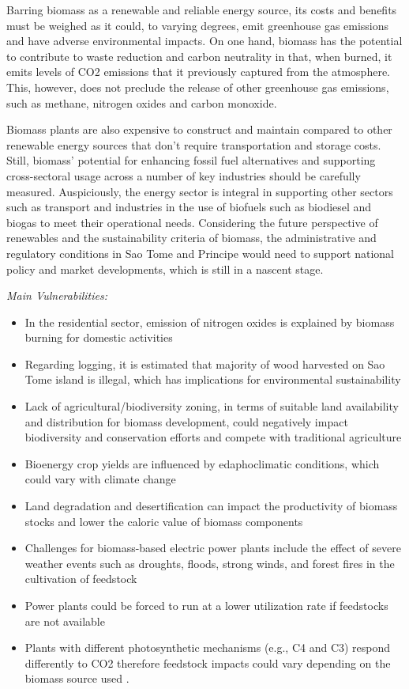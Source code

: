 \documentclass[
]{book}
\providecommand{\tightlist}{%
  \setlength{\itemsep}{0pt}\setlength{\parskip}{0pt}}
\begin{document}
Barring biomass as a renewable and reliable energy source, its costs and benefits must be weighed as it could, to varying degrees, emit greenhouse gas emissions and have adverse environmental impacts. On one hand, biomass has the potential to contribute to waste reduction and carbon neutrality in that, when burned, it emits levels of CO2 emissions that it previously captured from the atmosphere. This, however, does not preclude the release of other greenhouse gas emissions, such as methane, nitrogen oxides and carbon monoxide.

Biomass plants are also expensive to construct and maintain compared to other renewable energy sources that don't require transportation and storage costs. Still, biomass' potential for enhancing fossil fuel alternatives and supporting cross-sectoral usage across a number of key industries should be carefully measured. Auspiciously, the energy sector is integral in supporting other sectors such as transport and industries in the use of biofuels such as biodiesel and biogas to meet their operational needs. Considering the future perspective of renewables and the sustainability criteria of biomass, the administrative and regulatory conditions in Sao Tome and Principe would need to support national policy and market developments, which is still in a nascent stage.

\emph{Main Vulnerabilities:}

\begin{itemize}
\tightlist
\item
  In the residential sector, emission of nitrogen oxides is explained by biomass burning for domestic activities
\item
  Regarding logging, it is estimated that majority of wood harvested on Sao Tome island is illegal, which has implications for environmental sustainability
\item
  Lack of agricultural/biodiversity zoning, in terms of suitable land availability and distribution for biomass development, could negatively impact biodiversity and conservation efforts and compete with traditional agriculture
\item
  Bioenergy crop yields are influenced by edaphoclimatic conditions, which could vary with climate change
\item
  Land degradation and desertification can impact the productivity of biomass stocks and lower the caloric value of biomass components
\item
  Challenges for biomass-based electric power plants include the effect of severe weather events such as droughts, floods, strong winds, and forest fires in the cultivation of feedstock
\item
  Power plants could be forced to run at a lower utilization rate if feedstocks are not available
\item
  Plants with different photosynthetic mechanisms (e.g., C4 and C3) respond differently to CO2 therefore feedstock impacts could vary depending on the biomass source used .
\end{itemize}
\end{document}

